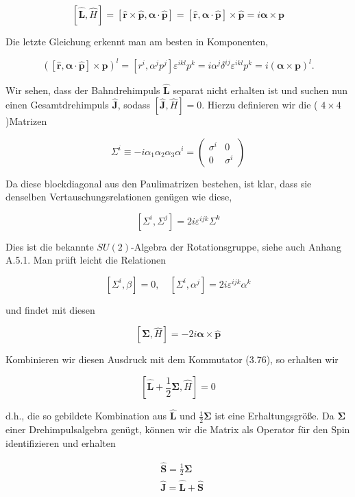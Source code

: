 \documentclass[10pt, letterpaper]{article}
\begin{document}
$$
[\hat{\mathbf{L}}, \hat{H}]=[\hat{\mathbf{r}} \times \hat{\mathbf{p}}, \boldsymbol{\alpha} \cdot \hat{\mathbf{p}}]=[\hat{\mathbf{r}}, \boldsymbol{\alpha} \cdot \hat{\mathbf{p}}] \times \hat{\mathbf{p}}=i \boldsymbol{\alpha} \times \mathbf{p}
$$

Die letzte Gleichung erkennt man am besten in Komponenten,

$$
([\hat{\mathbf{r}}, \boldsymbol{\alpha} \cdot \hat{\mathbf{p}}] \times \hat{\mathbf{p}})^{l}=\left[r^{i}, \alpha^{j} p^{j}\right] \varepsilon^{i k l} p^{k}=i \alpha^{j} \delta^{i j} \varepsilon^{i k l} p^{k}=i(\boldsymbol{\alpha} \times \mathbf{p})^{l} .
$$

Wir sehen, dass der Bahndrehimpuls $\hat{\mathbf{L}}$ separat nicht erhalten ist und suchen nun einen Gesamtdrehimpuls $\hat{\mathbf{J}}$, sodass $[\hat{\mathbf{J}}, \hat{H}]=0$. Hierzu definieren wir die ( $4 \times 4$ )Matrizen

$$
\Sigma^{i} \equiv-i \alpha_{1} \alpha_{2} \alpha_{3} \alpha^{i}=\left(\begin{array}{cc}
\sigma^{i} & 0 \\
0 & \sigma^{i}
\end{array}\right)
$$

Da diese blockdiagonal aus den Paulimatrizen bestehen, ist klar, dass sie denselben Vertauschungsrelationen genügen wie diese,

$$
\left[\Sigma^{i}, \Sigma^{j}\right]=2 i \varepsilon^{i j k} \Sigma^{k}
$$

Dies ist die bekannte $S U(2)$-Algebra der Rotationsgruppe, siehe auch Anhang A.5.1. Man prüft leicht die Relationen

$$
\left[\Sigma^{i}, \beta\right]=0, \quad\left[\Sigma^{i}, \alpha^{j}\right]=2 i \varepsilon^{i j k} \alpha^{k}
$$

und findet mit diesen

$$
[\boldsymbol{\Sigma}, \hat{H}]=-2 i \boldsymbol{\alpha} \times \hat{\mathbf{p}}
$$

Kombinieren wir diesen Ausdruck mit dem Kommutator (3.76), so erhalten wir

$$
\left[\hat{\mathbf{L}}+\frac{1}{2} \boldsymbol{\Sigma}, \hat{H}\right]=0
$$

d.h., die so gebildete Kombination aus $\hat{\mathbf{L}}$ und $\frac{1}{2} \boldsymbol{\Sigma}$ ist eine Erhaltungsgröße. Da $\boldsymbol{\Sigma}$ einer Drehimpulsalgebra genügt, können wir die Matrix als Operator für den Spin identifizieren und erhalten

$$
\begin{aligned}
& \hat{\mathbf{S}}=\frac{1}{2} \boldsymbol{\Sigma} \\
& \hat{\mathbf{J}}=\hat{\mathbf{L}}+\hat{\mathbf{S}}
\end{aligned}
$$
\end{document}
